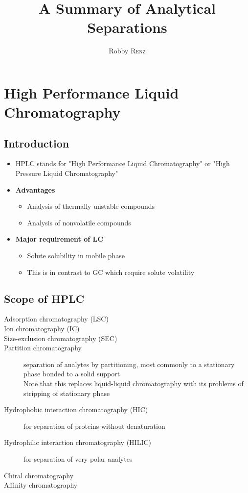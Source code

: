 \documentclass[a4paper, 12pt]{article}
\author{Robby \textsc{Renz}}
\title{A Summary of Analytical Separations}
\begin{document}
\maketitle
\newpage

\tableofcontents
\listoffigures
\listoftables
\newpage

\section{High Performance Liquid Chromatography}

\subsection{Introduction}
\begin{itemize}
	\item HPLC stands for "High Performance Liquid Chromatography" or "High Pressure Liquid Chromatography"
	\item \textbf{Advantages}
	\begin{itemize}
		\item Analysis of thermally unstable compounds
		\item Analysis of nonvolatile compounds
	\end{itemize}
	\item \textbf{Major requirement of LC}
	\begin{itemize}
		\item Solute solubility in mobile phase
		\item This is in contrast to GC which require solute volatility
	\end{itemize}
\end{itemize}


\subsection{Scope of HPLC}
\begin{description}
	\item[Adsorption chromatography (LSC)]
	\item[Ion chromatography (IC)]
	\item[Size-exclusion chromatography (SEC)]
	\item[Partition chromatography] separation of analytes by partitioning, most commonly to a stationary phase bonded to a solid support \\ Note that this replaces liquid-liquid chromatography with its problems of stripping of stationary phase
	\item[Hydrophobic interaction chromatography (HIC)] for separation of proteins without denaturation
	\item[Hydrophilic interaction chromatography (HILIC)] for separation of very polar analytes
	\item[Chiral chromatography]
	\item[Affinity chromatography]
\end{description}
\end{document}
